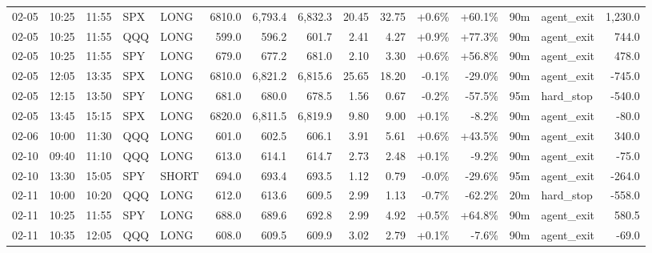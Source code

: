 \documentclass[11pt,a4paper,twoside]{article}
\begin{document}
\begin{landscape}
\begin{center}
\begin{longtable}{>{\color{txtmain}}l l l l l r r r r r r r r >{\color{txtmain}}l r}
02-05 & 10:25 & 11:55 & SPX & LONG & 6810.0 & 6,793.4 & 6,832.3 & 20.45 & 32.75 & \textcolor{wingreen}{+0.6\%} & \textcolor{wingreen}{+60.1\%} & 90m & agent\_exit & \textcolor{wingreen}{1,230.0} \\
02-05 & 10:25 & 11:55 & QQQ & LONG & 599.0 & 596.2 & 601.7 & 2.41 & 4.27 & \textcolor{wingreen}{+0.9\%} & \textcolor{wingreen}{+77.3\%} & 90m & agent\_exit & \textcolor{wingreen}{744.0} \\
02-05 & 10:25 & 11:55 & SPY & LONG & 679.0 & 677.2 & 681.0 & 2.10 & 3.30 & \textcolor{wingreen}{+0.6\%} & \textcolor{wingreen}{+56.8\%} & 90m & agent\_exit & \textcolor{wingreen}{478.0} \\
02-05 & 12:05 & 13:35 & SPX & LONG & 6810.0 & 6,821.2 & 6,815.6 & 25.65 & 18.20 & \textcolor{lossred}{-0.1\%} & \textcolor{lossred}{-29.0\%} & 90m & agent\_exit & \textcolor{lossred}{-745.0} \\
02-05 & 12:15 & 13:50 & SPY & LONG & 681.0 & 680.0 & 678.5 & 1.56 & 0.67 & \textcolor{lossred}{-0.2\%} & \textcolor{lossred}{-57.5\%} & 95m & hard\_stop & \textcolor{lossred}{-540.0} \\
02-05 & 13:45 & 15:15 & SPX & LONG & 6820.0 & 6,811.5 & 6,819.9 & 9.80 & 9.00 & \textcolor{wingreen}{+0.1\%} & \textcolor{lossred}{-8.2\%} & 90m & agent\_exit & \textcolor{lossred}{-80.0} \\
02-06 & 10:00 & 11:30 & QQQ & LONG & 601.0 & 602.5 & 606.1 & 3.91 & 5.61 & \textcolor{wingreen}{+0.6\%} & \textcolor{wingreen}{+43.5\%} & 90m & agent\_exit & \textcolor{wingreen}{340.0} \\
02-10 & 09:40 & 11:10 & QQQ & LONG & 613.0 & 614.1 & 614.7 & 2.73 & 2.48 & \textcolor{wingreen}{+0.1\%} & \textcolor{lossred}{-9.2\%} & 90m & agent\_exit & \textcolor{lossred}{-75.0} \\
02-10 & 13:30 & 15:05 & SPY & SHORT & 694.0 & 693.4 & 693.5 & 1.12 & 0.79 & \textcolor{lossred}{-0.0\%} & \textcolor{lossred}{-29.6\%} & 95m & agent\_exit & \textcolor{lossred}{-264.0} \\
02-11 & 10:00 & 10:20 & QQQ & LONG & 612.0 & 613.6 & 609.5 & 2.99 & 1.13 & \textcolor{lossred}{-0.7\%} & \textcolor{lossred}{-62.2\%} & 20m & hard\_stop & \textcolor{lossred}{-558.0} \\
02-11 & 10:25 & 11:55 & SPY & LONG & 688.0 & 689.6 & 692.8 & 2.99 & 4.92 & \textcolor{wingreen}{+0.5\%} & \textcolor{wingreen}{+64.8\%} & 90m & agent\_exit & \textcolor{wingreen}{580.5} \\
02-11 & 10:35 & 12:05 & QQQ & LONG & 608.0 & 609.5 & 609.9 & 3.02 & 2.79 & \textcolor{wingreen}{+0.1\%} & \textcolor{lossred}{-7.6\%} & 90m & agent\_exit & \textcolor{lossred}{-69.0} \\

\end{longtable}
\end{center}
\end{landscape}
\end{document}
